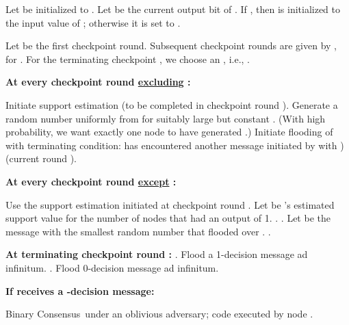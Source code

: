\documentclass[leqno,11pt]{article}
\newcommand{\bc}{{\sc Binary Consensus}}
\begin{document}
\begin{algorithm}[h]
  \begin{algorithmic}[1]
  \footnotesize
\EMPTY Let  be initialized to .
  \EMPTY
  Let  be the current output bit of . If , then  is
  initialized to the input value of ; otherwise it is set to . 
  
  Let  be the first checkpoint round. Subsequent checkpoint rounds are
  given by  , for . 
  For the terminating checkpoint , we choose an , i.e.,
  .
\EMPTY 
  \item[\bf At every checkpoint round  \underline{excluding} :] 
    
  \STATE Initiate support estimation (to be completed in checkpoint round ).
  \STATE Generate a random number  uniformly from  for suitably large but constant . (With high probability, we want exactly one node to have generated .)
  \STATE Initiate flooding of  with terminating condition: {\sc
  has encountered another message initiated by  with )  (current round ).}
  
  \EMPTY
  \item[\bf At every checkpoint round  \underline{except} :] 
  
  \STATE Use the support estimation initiated at checkpoint round . Let
   be 's estimated support value for the number of nodes that had an
  output of 1. 
  \IF{} \label{line:onequarter}
    \STATE .
  \ELSIF{}
    \STATE .
    \STATE Let  be the message with the smallest random number that flooded over .
    \STATE .
  \ENDIF
  
  \EMPTY
  \item[\bf At terminating checkpoint round :]
  \IF{} \label{line:oneHighOblivious}
   		\STATE .
      \STATE Flood a 1-decision message ad infinitum.
  \ELSIF{}
   		\STATE .
      \STATE Flood 0-decision message ad infinitum.
\ENDIF
  \EMPTY
  \item[\bf If  receives a -decision message:]
    \STATE 
  \end{algorithmic}
  \caption{\bc\ under an oblivious adversary; code executed by node .} \label{alg:bc}
\end{algorithm}
\normalsize
\end{document}
